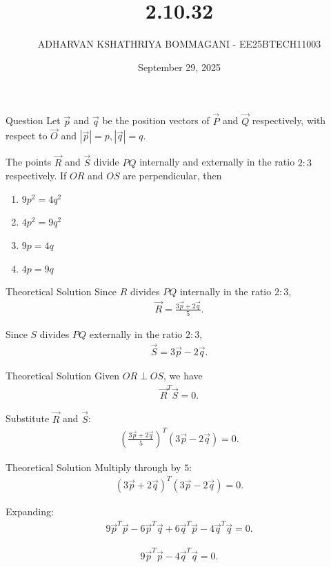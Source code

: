\documentclass{beamer}
\title{2.10.32}
\date{September 29, 2025}
\author{ADHARVAN KSHATHRIYA BOMMAGANI - EE25BTECH11003}
\begin{document}
\frame{\titlepage}

\begin{frame}{Question}
Let $\vec{p}$ and $\vec{q}$ be the position vectors of $\vec{P}$ and $\vec{Q}$ respectively, with respect to $\vec{O}$ and $|\vec{p}| = p, |\vec{q}| = q$. 

The points $\vec{R}$ and $\vec{S}$ divide $PQ$ internally and externally in the ratio $2:3$ respectively. If $OR$ and $OS$ are perpendicular, then
\begin{enumerate}[]
    \item $9p^2 = 4q^2$
    \item $4p^2 = 9q^2$
    \item $9p = 4q$
    \item $4p = 9q$
\end{enumerate}
\end{frame}

\begin{frame}{Theoretical Solution}
Since $R$ divides $PQ$ internally in the ratio $2:3$,
\begin{align*}
\vec{R} = \frac{3\vec{p} + 2\vec{q}}{5}.
\end{align*}

Since $S$ divides $PQ$ externally in the ratio $2:3$,
\begin{align*}
\vec{S} = 3\vec{p} - 2\vec{q}.
\end{align*}
\end{frame}

\begin{frame}{Theoretical Solution }
Given $OR \perp OS$, we have
\begin{align*}
\vec{R}^T \vec{S} = 0.
\end{align*}

Substitute $\vec{R}$ and $\vec{S}$:
\begin{align*}
\left(\frac{3\vec{p} + 2\vec{q}}{5}\right)^T (3\vec{p} - 2\vec{q}) = 0.
\end{align*}
\end{frame}

\begin{frame}{Theoretical Solution}
Multiply through by $5$:
\begin{align*}
(3\vec{p} + 2\vec{q})^T (3\vec{p} - 2\vec{q}) = 0.
\end{align*}

Expanding:
\begin{align*}
9\vec{p}^T\vec{p} - 6\vec{p}^T\vec{q} + 6\vec{q}^T\vec{p} - 4\vec{q}^T\vec{q} = 0.
\end{align*}

\begin{align*}
9\vec{p}^T\vec{p} - 4\vec{q}^T\vec{q} = 0.
\end{align*}
\end{frame}
\end{document}
